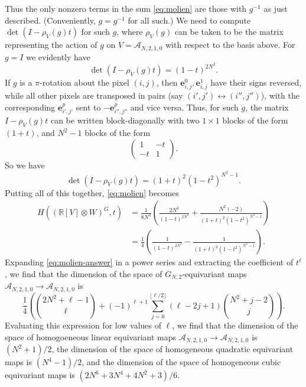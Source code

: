 \documentclass{article}
\theoremstyle{definition}
\begin{document}
Thus the only nonzero terms in the sum \eqref{eq:molien} are those with $g^{-1}$ as just described. (Conveniently, $g=g^{-1}$ for all such.) We need to compute $\det (I - \rho_V(g)t)$ for such $g$, where $\rho_V(g)$ can be taken to be the matrix representing the action of $g$ on $V=\mathcal{A}_{N,2,1,0}$ with respect to the basis above. For $g=I$ we evidently have 
\begin{equation}
    \det (I - \rho_V(g)t) = (1-t)^{2N^2}.
\end{equation} 
If $g$ is a $\pi$-rotation about the pixel $(i,j)$, then $\mathbf{e}_{i,j}^0,\mathbf{e}_{i,j}^1$ have their signs reversed, while all other pixels are transposed in pairs (say $(i',j')\leftrightarrow (i'',j'')$), with the corresponding $\mathbf{e}_{i',j'}^p$ sent to $-\mathbf{e}_{i'',j''}^p$ and vice versa. Thus, for such $g$, the matrix $I - \rho_V(g)t$ can be written block-diagonally with two $1\times 1$ blocks of the form $(1+t)$, and $N^2-1$ blocks of the form \begin{equation}
\begin{pmatrix}1 & -t \\ -t & 1\end{pmatrix}.
\end{equation}
So we have
\begin{equation}
\det(I - \rho_V(g)t) = (1+t)^2(1-t^2)^{N^2-1}.
\end{equation}
Putting all of this together, \eqref{eq:molien} becomes
\begin{align}
  H((\mathbb{R}[V]\otimes W)^G,t) &=  \frac{1}{8N^2}\left(\frac{2N^2}{(1-t)^{2N^2}}+\frac{N^2(-2)}{(1+t)^2(1-t^2)^{N^2-1}}\right)\\
  &= \frac{1}{4}\left(\frac{1}{(1-t)^{2N^2}} - \frac{1}{(1+t)^2(1-t^2)^{N^2-1}}\right).\label{eq:molien-answer}
\end{align}
Expanding \eqref{eq:molien-answer} in a power series and extracting the coefficient of $t^\ell$, we find that the dimension of the space of $G_{N,2}$-equivariant maps $\mathcal{A}_{N,2,1,0}\rightarrow\mathcal{A}_{N,2,1,0}$ is 
\begin{equation}
    \frac{1}{4}\left(\binom{2N^2+\ell - 1}{\ell} +(-1)^{\ell+1}\sum_{j=0}^{\lfloor \ell/2\rfloor} (\ell - 2j + 1)\binom{N^2+j-2}{j}\right).
\end{equation}
Evaluating this expression for low values of $\ell$, we find that the dimension of the space of homogoeneous linear equivariant maps $\mathcal{A}_{N,2,1,0}\rightarrow \mathcal{A}_{N,2,1,0}$ is $(N^2+1)/2$, the dimension of the space of homogeneous quadratic equivariant maps is $(N^4-1)/2$, and the dimension of the space of homogeneous cubic equivariant maps is $(2N^6 + 3N^4 + 4N^2 + 3)/6$.
 
\end{document}
